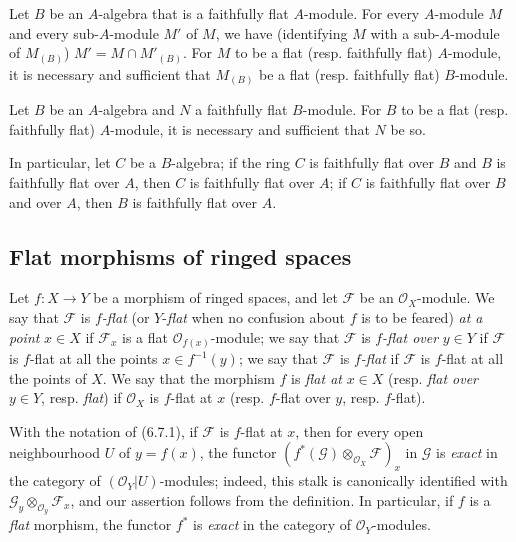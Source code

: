 \begin{env}[6.6.3]
\label{0.6.6.3}
Let $B$ be an $A$-algebra that is a faithfully flat $A$-module. For every
$A$-module $M$ and every sub-$A$-module $M'$ of $M$, we have (identifying $M$
with a sub-$A$-module of $M_{(B)}$) $M'=M\cap M'_{(B)}$. For $M$ to be a
flat (resp. faithfully flat) $A$-module, it is necessary and sufficient that $M_{(B)}$
be a flat (resp. faithfully flat) $B$-module.
\end{env}

\begin{env}[6.6.4]
\label{0.6.6.4}
Let $B$ be an $A$-algebra and $N$ a faithfully flat $B$-module. For $B$
to be a flat (resp. faithfully flat) $A$-module, it is necessary and sufficient that $N$
be so.

In particular, let $C$ be a $B$-algebra; if the ring $C$ is faithfully
flat over $B$ and $B$ is faithfully flat over $A$, then $C$ is faithfully flat
over $A$; if $C$ is faithfully flat over $B$ and over $A$, then $B$ is
faithfully flat over $A$.
\end{env}

\subsection{Flat morphisms of ringed spaces}
\label{subsection:0.6.7}

\begin{env}[6.7.1]
\label{0.6.7.1}
Let $f:X\to Y$ be a morphism of ringed spaces, and let $\mathcal F$ be an
$\mathcal O_X$-module. We say that $\mathcal F$ is \emph{$f$-flat} (or $Y$-\emph{flat}
when no confusion about $f$ is to be feared) \emph{at a point} $x\in X$ if
$\mathcal F_x$ is a flat $\mathcal O_{f(x)}$-module; we say that
$\mathcal F$ is \emph{$f$-flat over} $y\in Y$ if $\mathcal F$ is $f$-flat
at all the points $x\in f^{-1}(y)$; we say that $\mathcal F$ is \emph{$f$-flat}
if $\mathcal F$ is $f$-flat at all the points of $X$. We say that the
morphism $f$ is \emph{flat at} $x\in X$ (resp. \emph{flat over} $y\in Y$, resp.
\emph{flat}) if $\mathcal O_X$ is $f$-flat at $x$ (resp. $f$-flat over $y$,
resp. $f$-flat).
\end{env}

\begin{env}[6.7.2]
\label{0.6.7.2}
With the notation of (6.7.1), if $\mathcal F$ is $f$-flat at $x$, then for every
open neighbourhood $U$ of $y=f(x)$, the functor
$(f^*(\mathcal G)\otimes_{\mathcal O_X}\mathcal F)_x$ in $\mathcal G$ is
\emph{exact} in the category of $(\mathcal O_Y|U)$-modules; indeed, this
stalk is canonically identified with
$\mathcal G_y\otimes_{\mathcal O_y}\mathcal F_x$, and our assertion follows
from the definition. In particular, if $f$ is a \emph{flat} morphism, the functor
$f^*$ is \emph{exact} in the category of $\mathcal O_Y$-modules.
\end{env}

